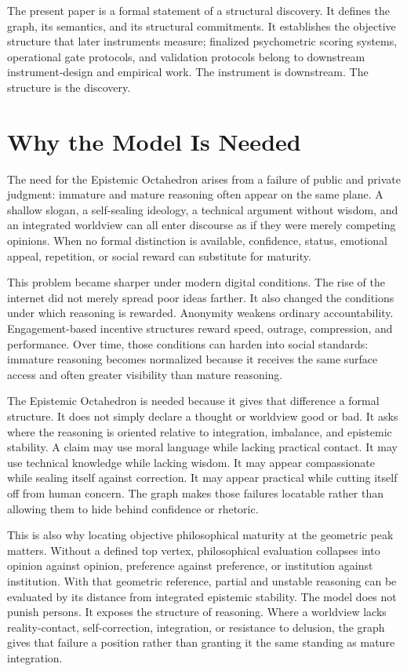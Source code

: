 \documentclass[11pt]{article}
\begin{document}
The present paper is a formal statement of a structural discovery. It defines the graph, its semantics, and its structural commitments. It establishes the objective structure that later instruments measure; finalized psychometric scoring systems, operational gate protocols, and validation protocols belong to downstream instrument-design and empirical work. The instrument is downstream. The structure is the discovery.


\section{Why the Model Is Needed}

The need for the Epistemic Octahedron arises from a failure of public and private judgment: immature and mature reasoning often appear on the same plane. A shallow slogan, a self-sealing ideology, a technical argument without wisdom, and an integrated worldview can all enter discourse as if they were merely competing opinions. When no formal distinction is available, confidence, status, emotional appeal, repetition, or social reward can substitute for maturity.

This problem became sharper under modern digital conditions. The rise of the internet did not merely spread poor ideas farther. It also changed the conditions under which reasoning is rewarded. Anonymity weakens ordinary accountability. Engagement-based incentive structures reward speed, outrage, compression, and performance. Over time, those conditions can harden into social standards: immature reasoning becomes normalized because it receives the same surface access and often greater visibility than mature reasoning.

The Epistemic Octahedron is needed because it gives that difference a formal structure. It does not simply declare a thought or worldview good or bad. It asks where the reasoning is oriented relative to integration, imbalance, and epistemic stability. A claim may use moral language while lacking practical contact. It may use technical knowledge while lacking wisdom. It may appear compassionate while sealing itself against correction. It may appear practical while cutting itself off from human concern. The graph makes those failures locatable rather than allowing them to hide behind confidence or rhetoric.

This is also why locating objective philosophical maturity at the geometric peak matters. Without a defined top vertex, philosophical evaluation collapses into opinion against opinion, preference against preference, or institution against institution. With that geometric reference, partial and unstable reasoning can be evaluated by its distance from integrated epistemic stability. The model does not punish persons. It exposes the structure of reasoning. Where a worldview lacks reality-contact, self-correction, integration, or resistance to delusion, the graph gives that failure a position rather than granting it the same standing as mature integration.
\end{document}
